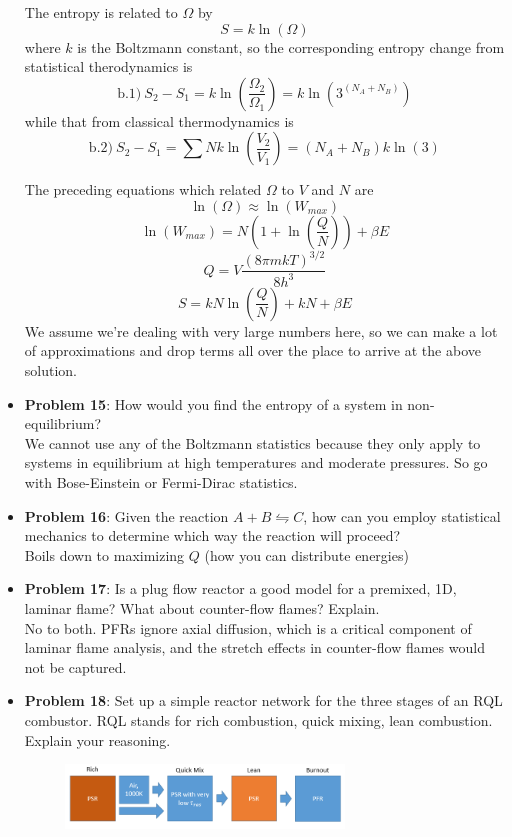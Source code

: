 \documentclass[11pt]{article}
\newcommand{\Item}[1]{\item \textbf{#1}:}
\newcommand{\Problem}[1]{\Item{Problem #1}}
\begin{document}
\begin{itemize}
The entropy is related to $\Omega$ by
$$S = k\ln(\Omega)$$
where $k$ is the Boltzmann constant, so the corresponding entropy change from statistical therodynamics is
$$\textrm{b.1})\ S_2 - S_1 = k\ln\left(\frac{\Omega_2}{\Omega_1}\right) = k\ln\left(3^{(N_A+N_B)}\right)$$
while that from classical thermodynamics is
$$\textrm{b.2})\ S_2 - S_1 = \sum Nk\ln\left(\frac{V_2}{V_1}\right) = (N_A+N_B)k\ln(3)$$

The preceding equations which related $\Omega$ to $V$ and $N$ are
$$\ln(\Omega)\approx\ln(W_{max})$$
$$\ln(W_{max}) = N\left(1+\ln\left(\frac{Q}{N}\right)\right)+\beta E$$
$$Q=V\frac{(8\pi mkT)^{3/2}}{8h^3}$$
$$S = kN\ln\left(\frac{Q}{N}\right) + kN + \beta E$$
We assume we're dealing with very large numbers here, so we can make a lot of approximations and drop terms all over the place to arrive at the above solution.

\Problem{15} How would you find the entropy of a system in non-equilibrium?\\

We cannot use any of the Boltzmann statistics because they only apply to systems in equilibrium at high temperatures and moderate pressures. So go with Bose-Einstein or Fermi-Dirac statistics.

\Problem{16} Given the reaction $A+B\leftrightharpoons C$, how can you employ statistical mechanics to determine which way the reaction will proceed?\\

Boils down to maximizing $Q$ (how you can distribute energies)

\Problem{17} Is a plug flow reactor a good model for a premixed, 1D, laminar flame? What about counter-flow flames? Explain.\\

No to both. PFRs ignore axial diffusion, which is a critical component of laminar flame analysis, and the stretch effects in counter-flow flames would not be captured.

\Problem{18} Set up a simple reactor network for the three stages of an RQL combustor. RQL stands for rich combustion, quick mixing, lean combustion. Explain your reasoning.

\begin{figure}[h]\centering\includegraphics[width=0.7\textwidth]{Graphics/RQL_network.PNG}\end{figure}


\end{itemize}
\end{document}
